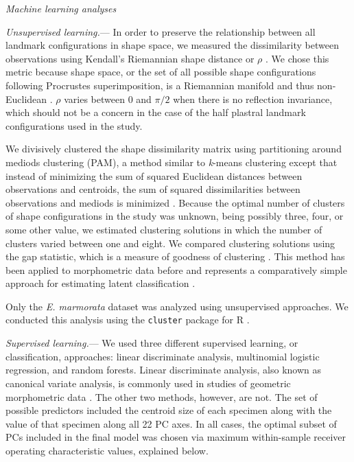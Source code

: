 \documentclass[12pt,letterpaper]{article}
\renewcommand{\subsection}[1]{%
\bigskip
\begin{center}
\begin{large}
\normalfont\itshape #1
\end{large}
\end{center}}
\renewcommand{\subsubsection}[1]{%
\vspace{2ex}
\noindent
\textit{#1.}---}
\begin{document}
\subsection{Machine learning analyses}
\subsubsection{Unsupervised learning}
In order to preserve the relationship between all landmark configurations in shape space, we measured the dissimilarity between observations using Kendall's Riemannian shape distance or \(\rho\) \citep{Kendall1984a,Dryden1998a}. We chose this metric because shape space, or the set of all possible shape configurations following Procrustes superimposition, is a Riemannian manifold and thus non-Euclidean \citep{Dryden1998a}. \(\rho\) varies between 0 and \(\pi / 2\) when there is no reflection invariance, which should not be a concern in the case of the half plastral landmark configurations used in the study.

We divisively clustered the shape dissimilarity matrix using partitioning around mediods clustering (PAM), a method similar to \textit{k}-means clustering except that instead of minimizing the sum of squared Euclidean distances between observations and centroids, the sum of squared dissimilarities between observations and mediods is minimized \citep{Kaufman1990}. Because the optimal number of clusters of shape configurations in the study was unknown, being possibly three, four, or some other value, we estimated clustering solutions in which the number of clusters varied between one and eight. We compared clustering solutions using the gap statistic, which is a measure of goodness of clustering \citep{Tibshirani2001a}. This method has been applied to morphometric data before and represents a comparatively simple approach for estimating latent classification \citep{Claude2008}.

Only the \textit{E. marmorata} dataset was analyzed using unsupervised approaches. We conducted this analysis using the \texttt{cluster} package for R \citep{Maechler2013}.

\subsubsection{Supervised learning}
We used three different supervised learning, or classification, approaches: linear discriminate analysis, multinomial logistic regression, and random forests. Linear discriminate analysis, also known as canonical variate analysis, is commonly used in studies of geometric morphometric data \citep{Zelditch2004,Claude2008,Mitteroecker2011}. The other two methods, however, are not. The set of possible predictors included the centroid size of each specimen along with the value of that specimen along all 22 PC axes. In all cases, the optimal subset of PCs included in the final model was chosen via maximum within-sample receiver operating characteristic values, explained below.
\end{document}
